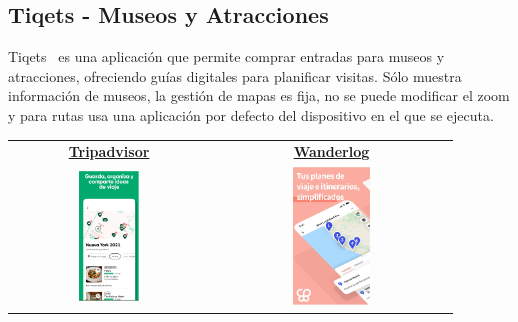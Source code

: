\subsection{Tiqets - Museos y Atracciones}
Tiqets~\cite{tiquets} es una aplicación que permite comprar entradas para museos y atracciones, ofreciendo guías digitales para planificar visitas. Sólo muestra información de museos, la gestión de mapas es fija, no se puede modificar el zoom y para rutas usa una aplicación por defecto del dispositivo en el que se ejecuta.


\begin{table}[h!]
	\centering
	\renewcommand{\arraystretch}{1.5} %
	\begin{tabular}{cc}
	\hline
	\href{https://play.google.com/store/apps/details?id=com.tripadvisor.tripadvisor}{\textbf{Tripadvisor}} & \href{https://play.google.com/store/apps/details?id=com.wanderlog.wanderlog}{\textbf{Wanderlog}} \\
	\includegraphics[width=0.32\textwidth]{img/tripadvisor.png} & \includegraphics[width=0.34\textwidth]{img/wanderlog.png} \\

\end{tabular}
\end{table}
